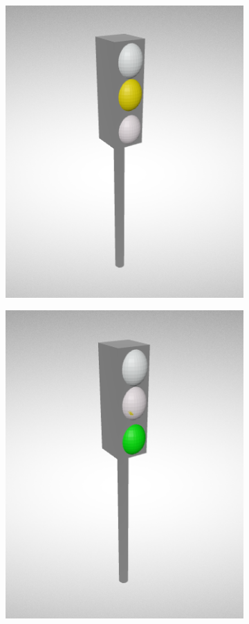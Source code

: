 \documentclass{report}
\begin{document}
\begin{figure}[h]
\begin{subfigure}[b]{0.3\textwidth}
    \includegraphics[width=\textwidth, height=1.2\textwidth]{images/cap4/amarillo.png}
    \label{fig:f2}
  \end{subfigure}
  \hfill
    \begin{subfigure}[b]{0.3\textwidth}
    \includegraphics[width=\textwidth, height=1.2\textwidth]{images/cap4/verde.png}

\end{subfigure}
\end{figure}
\end{document}
